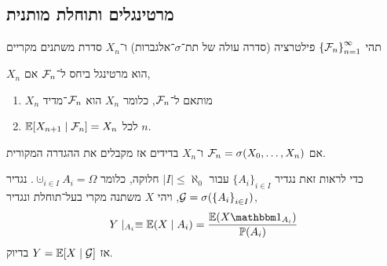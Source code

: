 \subsection{מרטינגלים ותוחלת מותנית}
תהי ${\{ \mathcal{F}_n \}}_{n = 1}^\infty$ פילטרציה (סדרה עולה של תת־$\sigma$־אלגברות) ו־$X_n$ סדרת משתנים מקריים
\begin{definition}
	$X_n$ הוא מרטינגל ביחס ל־$\mathcal{F}_n$ אם,
	\begin{enumerate}
		\item $X_n$ מותאם ל־$\mathcal{F}_n$, כלומר $X_n$ הוא $\mathcal{F}_n$־מדיד
		\item $\mathbb{E}[X_{n + 1} \mid \mathcal{F}_n] = X_n$ לכל $n$.
	\end{enumerate}
\end{definition}
\begin{remark}
	אם $\mathcal{F}_n = \sigma(X_0, \ldots, X_n)$ ו־$X_n$ בדידים אז מקבלים את ההגדרה המקורית.
\end{remark}
כדי לראות זאת נגדיר ${\{ A_i \}}_{i \in I}$ עבור $|I| \le \aleph_0$ חלוקה, כלומר $\cupdot_{i \in I} A_i = \Omega$.
נגדיר $\mathcal{G} = \sigma({\{ A_i \}}_{i \in I})$, ויהי $X$ משתנה מקרי בעל־תוחלת ונגדיר,
\[
	Y \mid_{A_i}
	\equiv \EE(X \mid A_i)
	= \frac{\EE(X \indicator_{A_i})}{\PP(A_i)}
\]
אז $Y = \mathbb{E}[X \mid \mathcal{G}]$ בדיוק.

